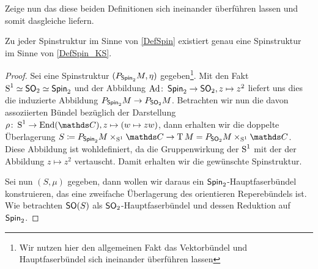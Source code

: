 Zeige nun das diese beiden Definitionen sich ineinander überführen
lassen und somit dasgleiche liefern.

\begin{Satz}
	Zu jeder Spinstruktur im Sinne von \cref{DefSpin} existiert
	genau eine Spinstruktur im Sinne von \cref{DefSpin_KS}.
	\begin{proof}
		Sei eine Spinstruktur $ (\Ph{\spin_2}{M},\eta) $ gegeben\footnote{Wir nutzen hier den allgemeinen Fakt das Vektorbündel und Hauptfaserbündel sich ineinander überführen lassen}.
		Mit den Fakt $ \S^1\simeq\so_2\simeq\spin_2 $ und der Abbildung
		$ \abb{\Ad}{\spin_2}{\so_2},z\mapsto z^2 $ liefert uns dies
		die induzierte Abbildung $ \Ph{\spin_2}{M}\rightarrow \Ph{\so_2}{M} $. Betrachten wir nun die davon assoziierten
		Bündel bezüglich der Darstellung $ \abb{\rho}{\S^1}{\End(\c)}, z\mapsto (w \mapsto zw) $, dann erhalten wir die doppelte
		Überlagerung $ S\coloneqq \Ph{\spin_2}{M}\times_{\S^1}\c \rightarrow {\TT M = \Ph{\so_2}{M}\times_{\S^1}\c} $. Diese Abbildung ist wohldefiniert, da die Gruppenwirkung der $ \S^1 $ mit der
	    der Abbildung $ z\mapsto z^2 $ vertauscht. Damit erhalten
	    wir die gewünschte Spinstruktur.
	    
	    Sei nun $ (S,\mu) $ gegeben, dann wollen wir daraus ein $ \spin_2 $-Hauptfaserbündel konstruieren, das eine zweifache Überlagerung des
	    orientieren Reperebündels ist. Wie betrachten $ \so(S) $ 
	    als $ \so_2 $-Hauptfaserbündel und dessen Reduktion auf $ \spin_2 $.
	    
	    
%	    
	    
		
	\end{proof}
\end{Satz}



